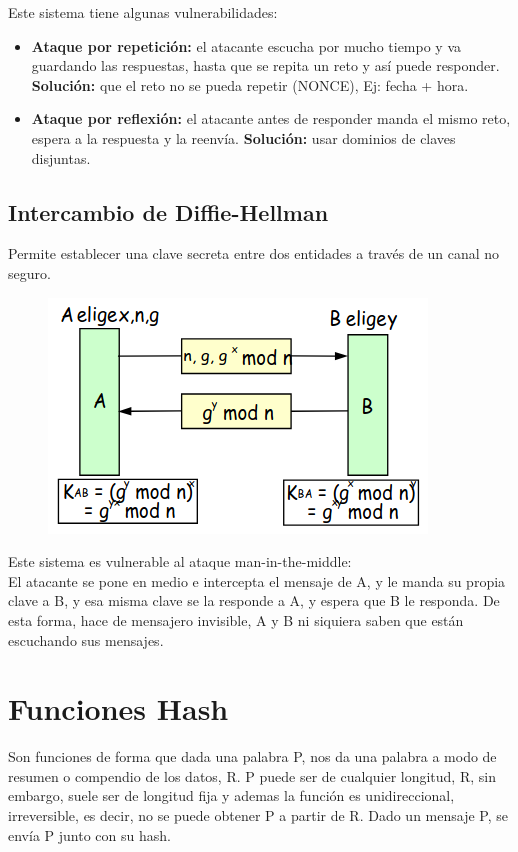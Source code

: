 Este sistema tiene algunas vulnerabilidades:
\begin{itemize}
    \item \textbf{Ataque por repetición:} el atacante escucha por mucho tiempo y va guardando las respuestas, hasta que se repita un reto y así puede responder. \textbf{Solución:} que el reto no se pueda repetir (NONCE), Ej: fecha + hora. 
    \item \textbf{Ataque por reflexión:} el atacante antes de responder manda el mismo reto, espera a la respuesta y la reenvía. \textbf{Solución:} usar dominios de claves disjuntas.
\end{itemize}

\subsection{Intercambio de Diffie-Hellman}
Permite establecer una clave secreta entre dos entidades a través de un canal no seguro. 
\begin{figure}[H]
    \centering
    \includegraphics[width=0.4\linewidth]{./images/diffie-hellman.png}
    \label{fig:diffie-hellman}
\end{figure}

\noindent
Este sistema es vulnerable al ataque man-in-the-middle:\\
El atacante se pone en medio e intercepta el mensaje de A, y le manda su propia clave a B, y esa misma clave se la responde a A, y espera que B le responda. De esta forma, hace de mensajero invisible, A y B ni siquiera saben que están escuchando sus mensajes. 

\section{Funciones Hash}

Son funciones de forma que dada una palabra P, nos da una palabra a modo de resumen o compendio de los datos, R. P puede ser de cualquier longitud, R, sin embargo, suele ser de longitud fija y ademas la función es unidireccional, irreversible, es decir, no se puede obtener P a partir de R. Dado un mensaje P, se envía P junto con su hash. \\

